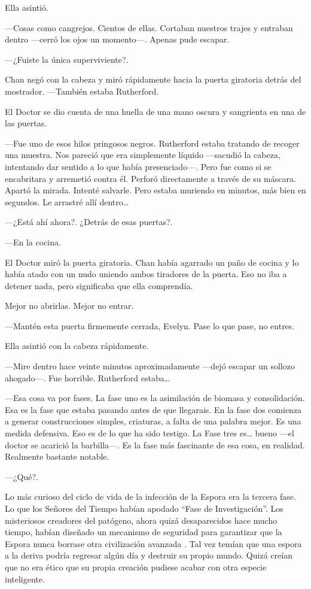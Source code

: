 Ella asintió.

---Cosas como cangrejos. Cientos de ellas. Cortaban nuestros trajes y
entraban dentro ---cerró los ojos un momento---. Apenas pude escapar.

---¿Fuiste la única superviviente?.

Chan negó con la cabeza y miró rápidamente hacia la puerta giratoria
detrás del mostrador. ---También estaba Rutherford.

El Doctor se dio cuenta de una huella de una mano oscura y sangrienta en
una de las puertas.

---Fue uno de esos hilos pringosos negros. Rutherford estaba tratando de
recoger una muestra. Nos pareció que era simplemente líquido ---sacudió
la cabeza, intentando dar sentido a lo que había presenciado---. Pero
fue como si se encabritara y arremetió contra él. Perforó directamente a
través de su máscara. Apartó la mirada. Intenté salvarle. Pero estaba
muriendo en minutos, más bien en segundos. Le arrastré allí
dentro\ldots{}

---¿Está ahí ahora?. ¿Detrás de esas puertas?.

---En la cocina.

El Doctor miró la puerta giratoria. Chan había agarrado un paño de
cocina y lo había atado con un nudo uniendo ambos tiradores de la
puerta. Eso no iba a detener nada, pero significaba que ella comprendía.

Mejor no abrirlas. Mejor no entrar.

---Mantén esta puerta firmemente cerrada, Evelyn. Pase lo que pase, no
entres.

Ella asintió con la cabeza rápidamente.

---Mire dentro hace veinte minutos aproximadamente ---dejó escapar un
sollozo ahogado---. Fue horrible. Rutherford estaba\ldots{}

---Esa cosa va por fases. La fase uno es la asimilación de biomasa y
consolidación. Esa es la fase que estaba pasando antes de que llegarais.
En la fase dos comienza a generar construcciones simples, criaturas, a
falta de una palabra mejor. Es una medida defensiva. Eso es de lo que ha
sido testigo. La Fase tres es\ldots{} bueno ---el doctor se acarició la
barbilla---. Es la fase más fascinante de esa cosa, en realidad.
Realmente bastante notable.

---¿Qué?.

Lo más curioso del ciclo de vida de la infección de la Espora era la
tercera fase. Lo que los Señores del Tiempo habían apodado ``Fase de
Investigación''. Los misteriosos creadores del patógeno, ahora quizá
desaparecidos hace mucho tiempo, habían diseñado un mecanismo de
seguridad para garantizar que la Espora nunca borrase otra civilización
avanzada . Tal vez temían que una espora a la deriva podría regresar
algún día y destruir su propio mundo. Quizá creían que no era ético que
su propia creación pudiese acabar con otra especie inteligente.

